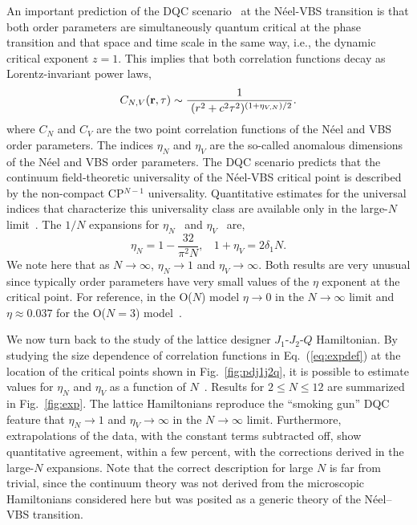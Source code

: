 \documentclass[range]{ar2e}
\begin{document}
An important prediction of the DQC scenario~\cite{Senthil04a} at the N\'eel-VBS transition is that both order parameters are
simultaneously quantum critical at the phase transition and that space and time scale in the same way, i.e., the dynamic critical 
exponent $z=1$. This implies that both correlation functions decay as Lorentz-invariant power laws,
\begin{equation}
\label{eq:expdef}
C_{N,V} ({\bf r},\tau) \sim  \frac{1}{~(r^2+c^2\tau^2)^{(1+\eta_{V,N})/2}}.
\end{equation}
 where $C_N$ and $C_V$ are the two point correlation functions of the
 N\'eel and VBS order parameters. The indices $\eta_N$ and $\eta_V$
 are the so-called anomalous dimensions of the N\'eel and VBS order
 parameters. The DQC scenario predicts that
 the continuum field-theoretic universality of the N\'eel-VBS critical
 point is described by the non-compact CP$^{N-1}$ universality. Quantitative
 estimates for the universal indices that characterize this
 universality class are available only in the large-$N$
 limit~\cite{halperin1974:largeN}. The ${1}/{N}$ expansions for $\eta_N$~\cite{kaul2008:u1} and $\eta_V$~\cite{murthy1990:mono,metlitski2008:mono} are,
\begin{equation}
\label{eq:oneonN}
\eta_N = 1 - \frac{32}{\pi^2N},~~~~
1+\eta_V = 2 \delta_1 N.
\end{equation}
We note here that as $N\rightarrow\infty$, $\eta_N \rightarrow 1$ and
$\eta_V\rightarrow \infty$. Both results are very unusual since
typically order parameters have very small values of the $\eta$
exponent at the critical point. For reference, in the O($N$) model $\eta\rightarrow
0$ in the $N\rightarrow\infty$ limit and $\eta \approx 0.037$ for the O($N=3$) model~\cite{campostrini2002:o3}.

We now turn back to the study of the lattice designer $J_1$-$J_2$-$Q$ Hamiltonian. By studying the size dependence of correlation 
functions in Eq.~(\ref{eq:expdef}) at the location of the critical points shown in Fig.~\ref{fig:pdj1j2q}, it is possible to
estimate values for $\eta_N$ and $\eta_V$ as a function of $N$~\cite{lou2009:sun,kaul2011:j1j2}. Results for $2\leq N \leq 12$ are 
summarized in Fig.~\ref{fig:exp}. The lattice Hamiltonians reproduce the ``smoking gun'' DQC feature that $\eta_N \to 1$ and $\eta_V \to \infty$ in 
the $N\rightarrow \infty$ limit. Furthermore, extrapolations of the data, with the constant terms subtracted off, show quantitative 
agreement, within a few percent, with the corrections derived in the large-$N$ expansions. Note that the correct description for large 
$N$ is far from trivial, since the continuum theory was not derived from the microscopic Hamiltonians considered here but was posited as a 
generic theory of the N\'eel--VBS transition. 
\end{document}
